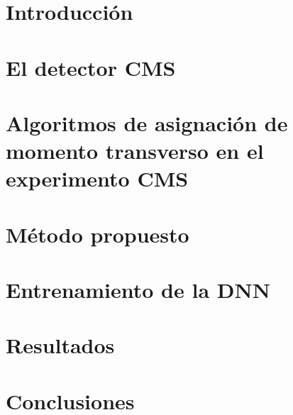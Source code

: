 \documentclass[a4paper,11pt]{article}
\begin{document}
\newpage

\tableofcontents

\newpage

\section{Introducci\'on}



\newpage

\section{El detector CMS}\label{CMS}



\newpage

\section{Algoritmos de asignaci\'on de momento transverso en el experimento CMS}\label{current_assignment}



\newpage

\section{M\'etodo propuesto}\label{methodology}



\newpage

\section{Entrenamiento de la DNN}\label{training}



\newpage

\section{Resultados}\label{results}



\newpage

\section{Conclusiones}\label{conclusions}



\newpage



\end{document}
